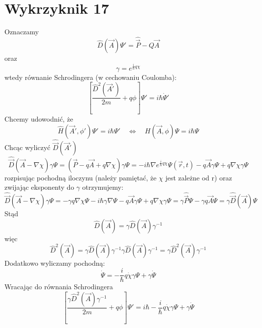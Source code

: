 \documentclass[a4paper,12pt]{article}
\begin{document}
\section{Wykrzyknik 17}
Oznaczamy 
\begin{equation*}
  \hat{D} (\vec{A}) \Psi' = \hat{\vec{P}} - Q \vec{A}
\end{equation*}
oraz
\begin{equation*}
  \gamma = e^{\frac{i}{\hbar}q\chi}
\end{equation*}
wtedy równanie Schrodingera (w cechowaniu Coulomba):
\begin{equation*}
  \left[ \frac{\hat{D}^2(\vec{A}')}{2m} + q\phi \right] \Psi' = i \hbar
  \dot{\Psi}'
\end{equation*}
Chcemy udowodnić, że
\begin{equation*}
  \hat{H}(\vec{A}', \phi') \Psi' = i\hbar \Psi' \quad \Leftrightarrow \quad
  H(\vec{A}, \phi) \Psi = i\hbar \Psi
\end{equation*}
Chcąc wyliczyć $\hat{\vec{D}}(\vec{A}')$ 
\begin{equation*}
  \hat{\vec{D}} (\vec{A} - \nabla \chi) \gamma \Psi = \left( \vec{P} - q\vec{A}
  + q\nabla \chi \right) \gamma \Psi = -i \hbar \nabla
  e^{\frac{i}{\hbar}q\chi} \Psi(\vec{r}, t) - q \vec{A} \gamma\Psi + q\nabla\chi
  \gamma \Psi
\end{equation*}
rozpisując pochodną iloczynu (należy pamiętać, że $\chi$ jest zależne od r)
oraz zwijając eksponenty do $\gamma$ otrzymujemy:
\begin{equation*}
  \hat{\vec{D}} (\vec{A} - \nabla \chi) \gamma \Psi = -\gamma q \nabla \chi \Psi
  - i\hbar \gamma \nabla \Psi - q\vec{A} \gamma \Psi + q\nabla \chi \gamma \Psi
  = \gamma \hat{\vec{P}} \Psi - \gamma q \vec{A} \Psi = \gamma \hat{\vec{D}}
  (\vec{A}) \Psi
\end{equation*}
Stąd 
\begin{equation*}
  \hat{D}(\vec{A}) = \gamma\hat{D} (\vec{A})\gamma^{-1}
\end{equation*}
więc
\begin{equation*}
  \hat{D}^2 (\vec{A}) = \gamma\hat{D}(\vec{A})\gamma^{-1} \gamma
  \hat{D}(\vec{A}) \gamma^{-1} = \gamma \hat{D}^2(\vec{A}) \gamma^{-1}
\end{equation*}
Dodatkowo wyliczamy pochodną:
\begin{equation*}
  \dot{\Psi} = -\frac{i}{\hbar}q \dot{\chi} \gamma\Psi + \gamma\dot{\Psi}
\end{equation*}
Wracając do równania Schrodingera
\begin{equation*}
  \left[ \frac{\gamma \hat{D}^2(\vec{A}) \gamma^{-1}
}{2m} + q\phi \right] \Psi' = i \hbar -\frac{i}{\hbar}q \dot{\chi} \gamma\Psi +
\gamma\dot{\Psi}
\end{equation*}
\end{document}
